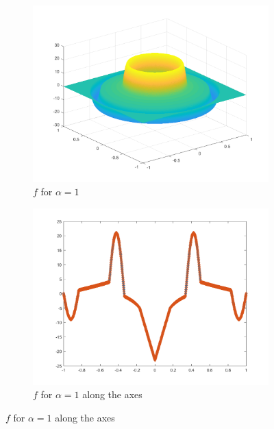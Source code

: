 \begin{frame}
  \begin{figure}[!ht]
    \centering
    \begin{subfigure}{.4\linewidth}
      \includegraphics[width=\linewidth]
        {pictures/experiments/settings/f01/rhs.png}
      \caption*{$f$ for $\alpha=1$}
    \end{subfigure}
    \quad
    \begin{subfigure}{.4\linewidth}
      \includegraphics[width=\linewidth]
        {pictures/experiments/settings/f01/rhsAxis.png}
      \caption*{$f$ for $\alpha=1$ along the axes}
    \end{subfigure}
  \end{figure}
\end{frame}

